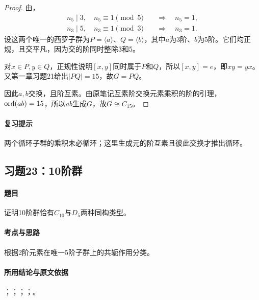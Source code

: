 \begin{proof}
由，
\begin{align*}
n_5\mid3,\quad n_5\equiv1\pmod5&\quad\Longrightarrow\quad n_5=1,\\
n_3\mid5,\quad n_3\equiv1\pmod3&\quad\Longrightarrow\quad n_3=1.
\end{align*}
设这两个唯一的西罗子群为$P=\langle a\rangle$、$Q=\langle b\rangle$，其中$a$为3阶、$b$为5阶。它们均正规，且交平凡，因为交的阶同时整除3和5。

对$x\in P,y\in Q$，正规性说明$[x,y]$同时属于$P$和$Q$，所以$[x,y]=e$，即$xy=yx$。又第一章习题21给出$|PQ|=15$，故$G=PQ$。

因此$a,b$交换，且阶互素。由原笔记互素阶交换元素乘积的阶的引理，$\operatorname{ord}(ab)=15$，所以$ab$生成$G$，故$G\cong C_{15}$。
\end{proof}

\paragraph{复习提示}
两个循环子群的乘积未必循环；这里生成元的阶互素且彼此交换才推出循环。


\subsection{习题23：\texorpdfstring{10阶群}{10阶群}}
\label{ex:2:23}

\paragraph{题目}
证明10阶群恰有$C_{10}$与$D_5$两种同构类型。

\paragraph{考点与思路}
根据2阶元素在唯一5阶子群上的共轭作用分类。

\paragraph{所用结论与原文依据}
；；；；。


